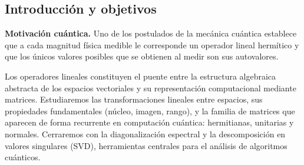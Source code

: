 \portada

\begin{esquemaExplorador}
\end{esquemaExplorador}


\subsection{Introducción y objetivos}

\begin{info}
  \textbf{Motivación cuántica.}
  Uno de los postulados de la mecánica cuántica establece que a cada magnitud física medible le corresponde un operador lineal hermítico y que los únicos valores posibles que se obtienen al medir son sus autovalores.
\end{info}

Los operadores lineales constituyen el puente entre la estructura algebraica abstracta de los espacios vectoriales y su representación computacional mediante matrices. Estudiaremos las transformaciones lineales entre espacios, sus propiedades fundamentales (núcleo, imagen, rango), y la familia de matrices que aparecen de forma recurrente en computación cuántica: hermitianas, unitarias y normales. Cerraremos con la diagonalización espectral y la descomposición en valores singulares (SVD), herramientas centrales para el análisis de algoritmos cuánticos.

